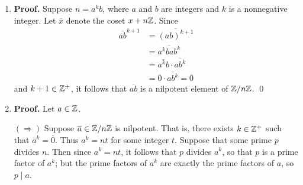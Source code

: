 \begin{enumerate}
      \begin{enumerate}
         \item \textbf{Proof.} Suppose $n = a^kb$, where $a$ and $b$ are
               integers and $k$ is a nonnegative integer. Let $\overline{x}$
               denote the coset $x + n\mathbb{Z}$. Since
               \begin{align*}
                  \overline{ab}^{k+1} &= \overline{(ab)^{k+1}} \\
                     &= \overline{a^kbab^k} \\
                     &= \overline{a^kb} \cdot \overline{ab^k} \\
                     &= \overline{0} \cdot \overline{ab^k} = \overline{0}
               \end{align*}
               and $k + 1 \in \mathbb{Z}^+$, it follows that $\overline{ab}$ is a
               nilpotent element of $\mathbb{Z}/n\mathbb{Z}$. \qed
         \item \textbf{Proof.} Let $a \in \mathbb{Z}$.

               $(\Rightarrow)$ Suppose $\overline{a} \in \mathbb{Z}/n\mathbb{Z}$ is nilpotent.
               That is, there exists $k \in \mathbb{Z}^+$ such that
               $\overline{a}^k = \overline{0}$. Thus $a^k = nt$ for some integer
               $t$. Suppose that some prime $p$ divides $n$. Then since
               $a^k = nt$, it follows that $p$ divides $a^k$, so that $p$ is a
               prime factor of $a^k$; but the prime factors of $a^k$ are exactly
               the prime factors of $a$, so $p \mid a$.


\end{enumerate}
\end{enumerate}
